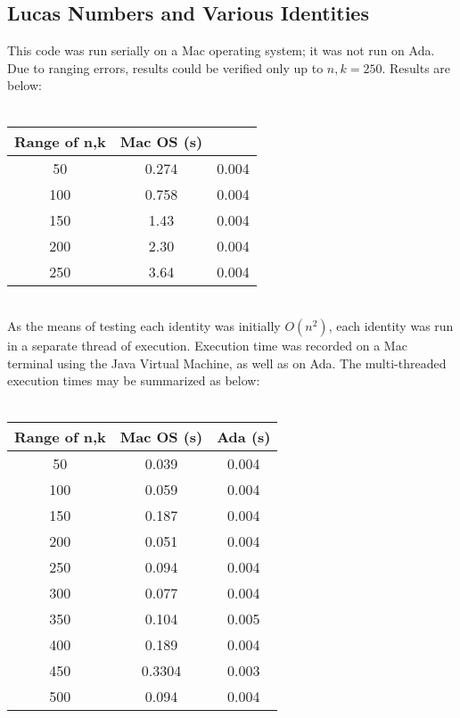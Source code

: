 \documentclass[11pt]{article}
\begin{document}
\begin{enumerate}
\subsection{Lucas Numbers and Various Identities}
This code was run serially on a Mac operating system; it was not run on Ada. Due to ranging errors, results could be verified only up to $n,k=250$. Results are below: \\ \\
\begin{tabular}{ccc} \\
\hline
 Range of n,k & Mac OS (s)  \\ \hline
50 & 0.274 & 0.004\\
100 & 0.758 & 0.004 \\
150 & 1.43 & 0.004 \\
200 & 2.30 & 0.004 \\
250 & 3.64 & 0.004 \\ 
\hline \hline 
\end{tabular} \\
As the means of testing each identity was initially $O(n^{2})$, each identity was run in a separate thread of execution. Execution time was recorded on a Mac terminal using the Java Virtual Machine, as well as on Ada. The multi-threaded execution times may be summarized as below:\\ \\
\begin{tabular}{ccc}
\hline
 Range of n,k & Mac OS (s) & Ada (s) \\ \hline
50 & 0.039 & 0.004\\
100 & 0.059 & 0.004 \\
150 & 0.187 & 0.004 \\
200 & 0.051 & 0.004 \\
250 & 0.094 & 0.004 \\ 
300 & 0.077 & 0.004 \\
350 & 0.104 & 0.005 \\
400 & 0.189 & 0.004 \\
450 & 0.3304 & 0.003 \\
500 & 0.094 &0.004 \\ \hline \hline
\end{tabular} \\ \\


\end{enumerate}
\end{document}
